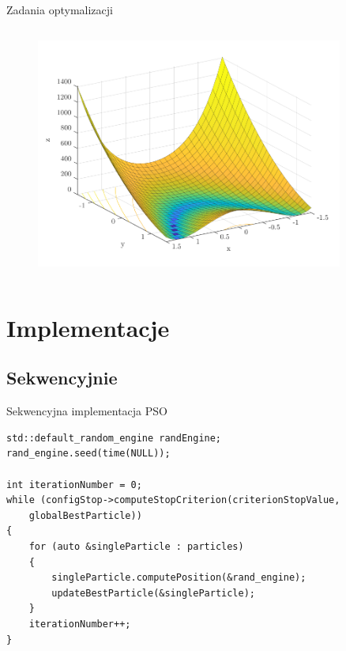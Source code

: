 \documentclass[handout]{beamer}
\begin{document}
\begin{frame}{Zadania optymalizacji}
\begin{columns}
\begin{column}[t]{0.5\textwidth}
\vspace{-.3cm}

\begin{figure}[t]
\includegraphics[width=0.9\textwidth]{grafiki/zad_2.pdf}
\end{figure}

\end{column}
\end{columns}
\end{frame}




\section{Implementacje}
\subsection{Sekwencyjnie}
\begin{frame}[fragile]{Sekwencyjna implementacja PSO}
\vspace{-.8cm}

\begin{lstlisting}[style=mycpp, label=code:pso_before, caption={Optymalizacja PSO - kod sekwencyjny.}]
std::default_random_engine randEngine;
rand_engine.seed(time(NULL));

int iterationNumber = 0;
while (configStop->computeStopCriterion(criterionStopValue,
	globalBestParticle))
{
    for (auto &singleParticle : particles)
    {
        singleParticle.computePosition(&rand_engine);
        updateBestParticle(&singleParticle);
    }
    iterationNumber++;
}
\end{lstlisting}

\end{frame}
\end{document}
